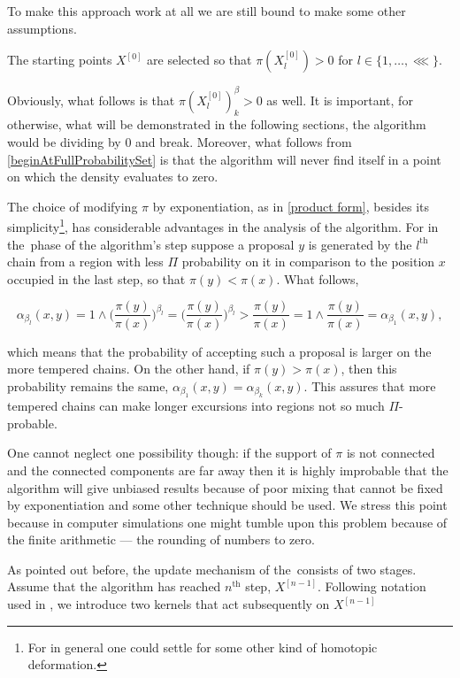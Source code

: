 To make this approach work at all we are still bound to make some other assumptions. 

\begin{assumptions}[resume]
	\item The starting points $X^{[0]}$ are selected so that $\pi(X_l^{[0]}) > 0$ for $l \in \{1,\dots,\lll\}$.\label{beginAtFullProbabilitySet}
\end{assumptions}
	
Obviously, what follows is that $\pi(X_l^{[0]})^\beta_k > 0$ as well. It is important, for otherwise, what will be demonstrated in the following sections, the algorithm would be dividing by $0$ and break. Moreover, what follows from \ref{beginAtFullProbabilitySet} is that the algorithm will never find itself in a point on which the density evaluates to zero.  

The choice of modifying $\pi$ by exponentiation, as in \ref{product form}, besides its simplicity\footnote{For in general one could settle for some other kind of homotopic deformation.}, has considerable advantages in the analysis of the algorithm. For in the \randomWalk\,phase of the algorithm's step suppose a proposal $y$ is generated by the $l^\text{th}$ chain from a region with less $\Pi$ probability on it in comparison to the position $x$ occupied in the last step, so that $\pi(y) < \pi(x)$. What follows,

$$ 
	\alpha_{\beta_l}(x,y) =  1 \wedge \Biggl(\frac{\pi(y)}{\pi(x)}\Biggl)^{\beta_l} = 
	\Biggl(\frac{\pi(y)}{\pi(x)}\Biggl)^{\beta_l} > \frac{\pi(y)}{\pi(x)} = 1 \wedge \frac{\pi(y)}{\pi(x)} = \alpha_{\beta_1}(x,y),
$$

which means that the probability of accepting such a proposal is larger on the more tempered chains. On the other hand, if  $\pi(y) > \pi(x)$, then this probability remains the same, $\alpha_{\beta_1}(x,y) = \alpha_{\beta_k}(x,y)$. This assures that more tempered chains can make longer excursions into regions not so much $\Pi$-probable. 

One cannot neglect one possibility though: if the support of $\pi$ is not connected and the connected components are far away then it is highly improbable that the algorithm will give unbiased results because of poor mixing that cannot be fixed by exponentiation and some other technique should be used. We stress this point because in computer simulations one might tumble upon this problem because of the finite arithmetic --- the rounding of numbers to zero.    

As pointed out before, the update mechanism of the \PT\,consists of two stages. Assume that the algorithm has reached $n^\text{th}$ step, $X^{[n-1]}$. Following notation used in \citet*{BM1}, we introduce two kernels that act subsequently on $X^{[n-1]}$


